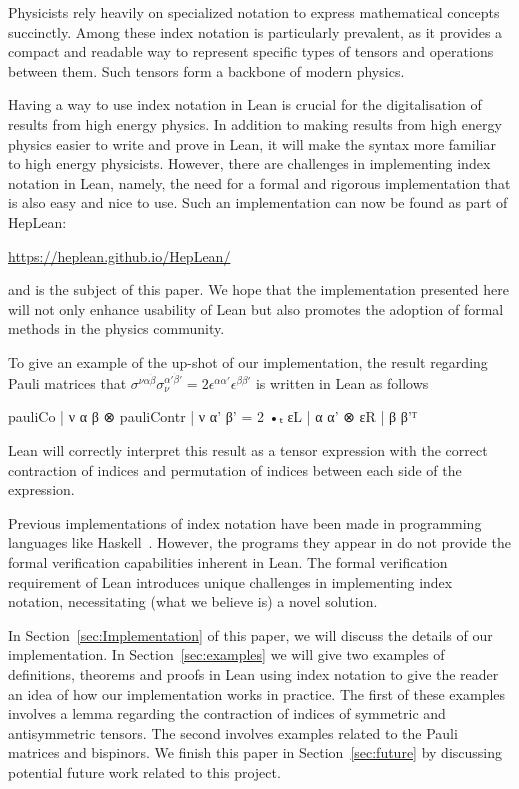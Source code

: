 \documentclass[a4paper, 11pt]{article}
\begin{document}
Physicists rely heavily on specialized notation to express mathematical concepts succinctly. 
Among these index notation is particularly prevalent,
 as it provides a compact and readable way to represent specific types of tensors and operations
 between them. Such tensors form a backbone of modern physics. 

Having a way to use index notation in Lean is crucial for the digitalisation of 
results from high energy physics. 
In addition to making results from high energy physics easier to write and prove in Lean, 
it will make the syntax more familiar to high energy physicists.
However, there are challenges in implementing index notation in Lean,
namely, the need for a formal and rigorous implementation that is also easy and nice to use. 
Such an implementation can now be found as part of HepLean:
\begin{center}
\url{https://heplean.github.io/HepLean/}
\end{center}
and is the subject of this paper.
We hope that the implementation presented here will
not only enhance usability of Lean but also promotes the adoption of formal methods in the 
physics community.

To give an example of the up-shot of our implementation, the result regarding Pauli matrices
that $\sigma^{\nu \alpha \dot \beta}\sigma_\nu^{ \alpha' \dot \beta'} = 2 \epsilon^{\alpha \alpha'}\epsilon^{\beta \beta'}$ 
is written in Lean as follows
\begin{code}
{pauliCo | ν α β ⊗ pauliContr | ν α' β' = 2 •ₜ εL | α α' ⊗ εR | β β'}ᵀ
\end{code}
Lean will correctly interpret this result as a tensor expression with the correct contraction of indices 
and permutation of indices between each side of the expression.

Previous implementations of index notation have been made in programming languages like Haskell~\cite{haskellPaper}. However, the programs they appear in do not
 provide the formal verification capabilities inherent in Lean. 
 The formal verification requirement of Lean introduces unique challenges in implementing index 
 notation, necessitating (what we believe is) a novel solution.

In Section~\ref{sec:Implementation} of this paper, we will discuss the details of our implementation. 
In Section~\ref{sec:examples} we will give two examples of definitions, theorems and proofs in Lean using index notation 
to give the reader an idea of how our implementation works in practice.
The first of these examples involves a lemma regarding the contraction of indices of symmetric and antisymmetric tensors. 
The second involves examples related to the Pauli matrices and bispinors. 
We finish this paper in Section~\ref{sec:future} by discussing potential future work related to this project.
\end{document}
